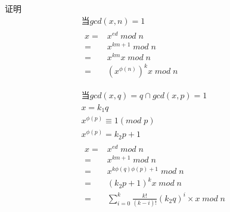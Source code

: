 \documentclass{article}
\begin{document}
证明
\begin{gather*}
  \text{当}gcd(x, n)=1 \\
  \begin{aligned}
    x =& x^{ed} \; mod \; n \\
    =& x^{km + 1} \; mod \; n \\
    =& x^{km}x \; mod \; n \\
    =& (x^{\phi(n)})^k x \; mod \; n \\
  \end{aligned} \\
  \\
  \text{当}gcd(x,q)=q \cap gcd(x,p)=1 \\
  x = k_1q \\
  x^{\phi(p)} \equiv 1 (mod \; p) \\
  x^{\phi(p)} = k_2p + 1 \\
  \begin{aligned}
    x =& x^{ed} \; mod \; n \\
    =& x^{km+1} \; mod \; n \\
    =& x^{k\phi(q)\phi(p)+1} \; mod \; n \\
    =& (k_2p + 1)^{k}x \; mod \; n \\
    =& \sum_{i=0}^{k}\frac{k!}{(k - i)!}(k_2q)^i \times x \; mod \; n
  \end{aligned}
\end{gather*}
\end{document}

